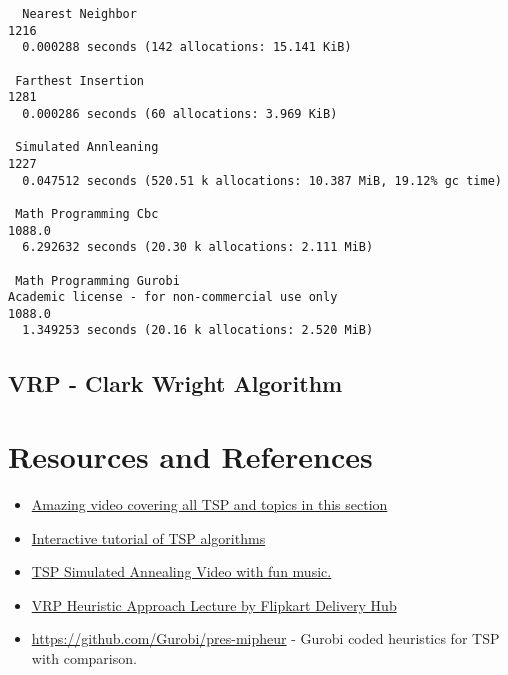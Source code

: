   \begin{verbatim}
  Nearest Neighbor
1216
  0.000288 seconds (142 allocations: 15.141 KiB)

 Farthest Insertion
1281
  0.000286 seconds (60 allocations: 3.969 KiB)

 Simulated Annleaning
1227
  0.047512 seconds (520.51 k allocations: 10.387 MiB, 19.12% gc time)

 Math Programming Cbc
1088.0
  6.292632 seconds (20.30 k allocations: 2.111 MiB)

 Math Programming Gurobi
Academic license - for non-commercial use only
1088.0
  1.349253 seconds (20.16 k allocations: 2.520 MiB)
  \end{verbatim}

\subsection{VRP - Clark Wright Algorithm}


\section*{Resources and References}
\begin{resource}

\begin{itemize}
\item \href{https://www.youtube.com/watch?v=GiDsjIBOVoA&ab_channel=Reducible}{Amazing video covering all TSP and topics in this section}
\item \href{https://cse442-17f.github.io/Traveling-Salesman-Algorithms/}{Interactive tutorial of TSP algorithms}
\item \href{https://www.youtube.com/watch?v=SC5CX8drAtU}{TSP Simulated Annealing Video with fun music.}
\item \href{https://www.youtube.com/watch?v=v9tUEsHD6BE&ab_channel=HasgeekTV}{VRP Heuristic Approach Lecture by Flipkart Delivery Hub}
\item \url{https://github.com/Gurobi/pres-mipheur} - Gurobi coded heuristics for TSP with comparison.  
\end{itemize}
\end{resource}

